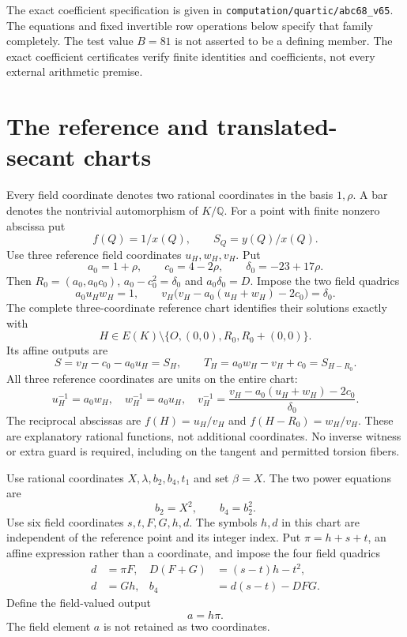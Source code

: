 \documentclass[11pt,a4paper]{article}
\newcommand{\Q}{\mathbb Q}\newcommand{\Z}{\mathbb Z}
\begin{document}
The exact coefficient specification is given in
\nolinkurl{computation/quartic/abc68_v65}. The equations and fixed
invertible row operations below specify that family completely.
The test value $B=81$ is not asserted to be a defining member.
The exact coefficient certificates verify finite identities and
coefficients, not every external arithmetic premise.

\section{The reference and translated-secant charts}
Every field coordinate denotes two rational coordinates in the basis
$1,\rho$. A bar denotes the nontrivial automorphism of $K/\Q$.
For a point with finite nonzero abscissa put
\[
                    f(Q)=1/x(Q),\qquad S_Q=y(Q)/x(Q).
\]
Use three reference field coordinates $u_H,w_H,v_H$. Put
\[
 a_0=1+\rho,\qquad c_0=4-2\rho,\qquad
 \delta_0=-23+17\rho.
\]
Then $R_0=(a_0,a_0c_0)$, $a_0-c_0^2=\delta_0$ and
$a_0\delta_0=D$. Impose the two field quadrics
\begin{equation}\label{eq:reference}
 a_0u_Hw_H=1,\qquad
 v_H\bigl(v_H-a_0(u_H+w_H)-2c_0\bigr)=\delta_0.
\end{equation}
The complete three-coordinate reference chart
\cite[Theorem~1.1 and Section~4]{Reference} identifies their
solutions exactly with
\[
 H\in E(K)\setminus\{O,(0,0),R_0,R_0+(0,0)\}.
\]
Its affine outputs are
\begin{equation}\label{eq:referenceoutputs}
 S=v_H-c_0-a_0u_H=S_H,\qquad
 T_H=a_0w_H-v_H+c_0=S_{H-R_0}.
\end{equation}
All three reference coordinates are units on the entire chart:
\[
 u_H^{-1}=a_0w_H,\quad w_H^{-1}=a_0u_H,\quad
 v_H^{-1}=\frac{v_H-a_0(u_H+w_H)-2c_0}{\delta_0}.
\]
The reciprocal abscissas are $f(H)=u_H/v_H$ and
$f(H-R_0)=w_H/v_H$. These are explanatory rational functions,
not additional coordinates. No inverse witness or extra guard
is required, including on the tangent and permitted torsion fibers.

Use rational coordinates $X,\lambda,b_2,b_4,t_1$ and set $\beta=X$.
The two power equations are
\begin{equation}\label{eq:powers}
                         b_2=X^2,\qquad b_4=b_2^2.
\end{equation}
Use six field coordinates $s,t,F,G,h,d$. The symbols $h,d$ in
this chart are independent of the reference point and its integer index.
Put $\pi=h+s+t$, an affine expression rather than a coordinate, and impose
the four field quadrics
\begin{equation}\label{eq:pair}
\begin{aligned}
 d&=\pi F,&
 D(F+G)&=(s-t)h-t^2,\\
 d&=Gh,&
 b_4&=d(s-t)-DFG.
\end{aligned}
\end{equation}
Define the field-valued output
\begin{equation}\label{eq:differenceoutput}
                            a=h\pi.
\end{equation}
The field element $a$ is not retained as two coordinates.
\end{document}
